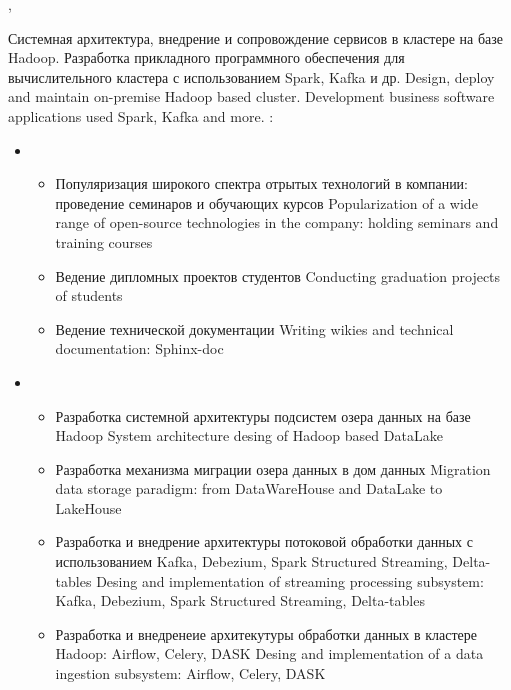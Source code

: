 \documentclass[11pt,a4paper,sans, russian]{moderncv}        %
\begin{document}
{\protect{}}
{\cityspb, \country}
{}
{
	{Системная архитектура, внедрение и сопровождение сервисов в кластере на базе Hadoop. Разработка прикладного программного обеспечения для вычислительного кластера с использованием Spark, Kafka и др.}
	{Design, deploy and maintain on-premise Hadoop based cluster. Development business software
	applications used Spark, Kafka and more.}
	\newline{}
	\achievements:
	\begin{itemize}
		\item {}
		\begin{itemize}
			\item {}
				{Популяризация широкого спектра отрытых технологий в компании: проведение семинаров и обучающих курсов}
				{Popularization of a wide range of open-source technologies in the company: holding seminars and training courses }
			\item {}
				{Ведение дипломных проектов студентов}
				{Conducting graduation projects of students}
			\item {}
				{Ведение технической документации}
				{Writing wikies and technical documentation: Sphinx-doc}
		\end{itemize}
		\item {}
		\begin{itemize}
			\item {}
				{Разработка системной архитектуры подсистем озера данных на базе Hadoop}
				{System architecture desing of Hadoop based DataLake}
			\item {}
				{Разработка механизма миграции озера данных в дом данных}
				{Migration data storage paradigm: from DataWareHouse and DataLake to LakeHouse }
			\item {}
				{Разработка и внедрение архитектуры потоковой обработки данных с использованием Kafka, Debezium, Spark Structured Streaming, Delta-tables}
				{Desing and implementation of streaming processing subsystem: Kafka, Debezium, Spark Structured Streaming, Delta-tables}
			\item {}
				{Разработка и внедренеие архитекутуры обработки данных в кластере Hadoop: Airflow, Celery, DASK}
				{Desing and implementation of a data ingestion subsystem: Airflow, Celery, DASK}

\end{itemize}
\end{itemize}}
\end{document}

